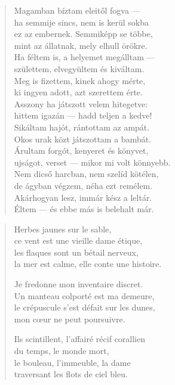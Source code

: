 \documentclass[11pt]{extbook}
\newcommand*{\centeredornament}{\centerline{\pgfornament[width=6cm]{88}}}
\begin{document}
\begin{verse}
  Magamban bíztam eleitől fogva --- \\
  ha semmije sincs, nem is kerül sokba \\
  ez az embernek. Semmiképp se többe, \\
  mint az állatnak, mely elhull örökre. \\
  Ha féltem is, a helyemet megálltam --- \\
  születtem, elvegyültem és kiváltam. \\
  Meg is fizettem, kinek ahogy mérte, \\
  ki ingyen adott, azt szerettem érte. \\
  Asszony ha játszott velem hitegetve: \\
  hittem igazán --- hadd teljen a kedve! \\
  Sikáltam hajót, rántottam az ampát. \\
  Okos urak közt játszottam a bambát. \\
  Árultam forgót, kenyeret és könyvet, \\
  ujságot, verset --- mikor mi volt könnyebb. \\
  Nem dicső harcban, nem szelíd kötélen, \\
  de ágyban végzem, néha ezt remélem. \\
  Akárhogyan lesz, immár kész a leltár. \\
  Éltem --- és ebbe más is belehalt már.
\end{verse}

\newpage


\vspace*{-15mm}
\centeredornament



\begin{verse}
  Herbes jaunes sur le sable, \\
  ce vent est une vieille dame étique, \\
  les flaques sont un bétail nerveux, \\
  la mer est calme, elle conte une histoire.

  Je fredonne mon inventaire discret. \\
  Un manteau colporté est ma demeure, \\
  le crépuscule s'est défait sur les dunes, \\
  mon cœur ne peut poursuivre.

  Ils scintillent, l'affairé récif corallien \\
  du temps, le monde mort, \\
  le bouleau, l'immeuble, la dame \\
  traversant les flots de ciel bleu.
\end{verse}
\end{document}
